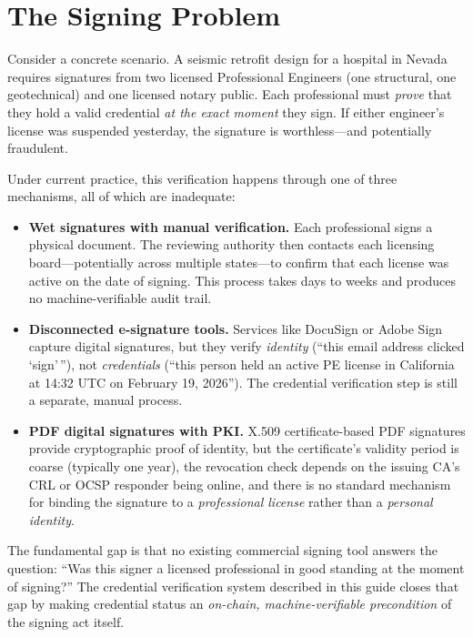 \section{The Signing Problem}
\label{sec:signing-problem}

Consider a concrete scenario.  A seismic retrofit design for a hospital in
Nevada requires signatures from two licensed Professional Engineers (one
structural, one geotechnical) and one licensed notary public.  Each
professional must \emph{prove} that they hold a valid credential \emph{at the
exact moment} they sign.  If either engineer's license was suspended yesterday,
the signature is worthless---and potentially fraudulent.

Under current practice, this verification happens through one of three
mechanisms, all of which are inadequate:

\begin{itemize}[leftmargin=*, nosep, itemsep=4pt]
  \item \textbf{Wet signatures with manual verification.}  Each professional
    signs a physical document.  The reviewing authority then contacts each
    licensing board---potentially across multiple states---to confirm that each
    license was active on the date of signing.  This process takes days to
    weeks and produces no machine-verifiable audit trail.
  \item \textbf{Disconnected e-signature tools.}  Services like DocuSign or
    Adobe Sign capture digital signatures, but they verify \emph{identity}
    (``this email address clicked `sign'\,''), not \emph{credentials} (``this
    person held an active PE license in California at 14:32 UTC on February
    19, 2026'').  The credential verification step is still a separate,
    manual process.
  \item \textbf{PDF digital signatures with PKI.}  X.509 certificate-based
    PDF signatures provide cryptographic proof of identity, but the
    certificate's validity period is coarse (typically one year), the
    revocation check depends on the issuing CA's CRL or OCSP responder
    being online, and there is no standard mechanism for binding the
    signature to a \emph{professional license} rather than a \emph{personal
    identity}.
\end{itemize}

The fundamental gap is that no existing commercial signing tool answers the
question: ``Was this signer a licensed professional in good standing at the
moment of signing?''  The credential verification system described in this
guide closes that gap by making credential status an \emph{on-chain,
machine-verifiable precondition} of the signing act itself.

